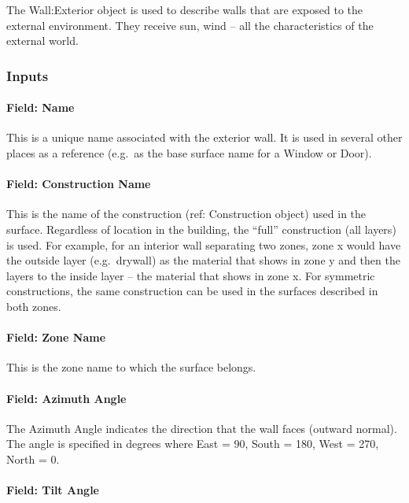 The Wall:Exterior object is used to describe walls that are exposed to the external environment. They receive sun, wind -- all the characteristics of the external world.

\subsubsection{Inputs}\label{inputs-4-035}

\paragraph{Field: Name}\label{field-name-047}

This is a unique name associated with the exterior wall. It is used in several other places as a reference (e.g.~as the base surface name for a Window or Door).

\paragraph{Field: Construction Name}\label{field-construction-name-003}

This is the name of the construction (ref: Construction object) used in the surface. Regardless of location in the building, the ``full'' construction (all layers) is used. For example, for an interior wall separating two zones, zone x would have the outside layer (e.g.~drywall) as the material that shows in zone y and then the layers to the inside layer -- the material that shows in zone x. For symmetric constructions, the same construction can be used in the surfaces described in both zones.

\paragraph{Field: Zone Name}\label{field-zone-name-012}

This is the zone name to which the surface belongs.

\paragraph{Field: Azimuth Angle}\label{field-azimuth-angle}

The Azimuth Angle indicates the direction that the wall faces (outward normal). The angle is specified in degrees where East = 90, South = 180, West = 270, North = 0.

\paragraph{Field: Tilt Angle}\label{field-tilt-angle}

